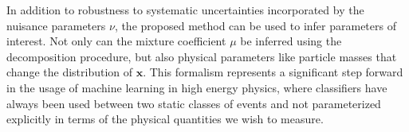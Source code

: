 \documentclass[12pt]{article}
\numberwithin{equation}{section}
\theoremstyle{plain}
\begin{document}
%
%

In addition to robustness to systematic uncertainties incorporated by the nuisance parameters $\nu$,
the proposed method can be used to infer parameters of interest. Not only can the mixture coefficient $\mu$
be inferred using the decomposition procedure, but also physical parameters like particle masses that change the distribution of $\mathbf{x}$.
This formalism represents a significant step forward in the usage of machine
learning in high energy physics, where classifiers have always been used between two static
classes of events and not parameterized explicitly in terms of the physical
quantities we wish to measure.
\end{document}

